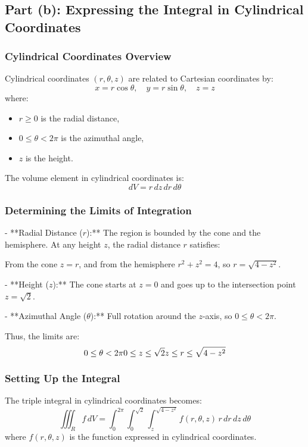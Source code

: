 \documentclass[11pt]{article}
\begin{document}
\newpage

\subsection{Part (b): Expressing the Integral in Cylindrical Coordinates}

\subsubsection{Cylindrical Coordinates Overview}
Cylindrical coordinates \((r, \theta, z)\) are related to Cartesian coordinates by:
\[
x = r \cos\theta, \quad y = r \sin\theta, \quad z = z
\]
where:
\begin{itemize}
    \item \( r \geq 0 \) is the radial distance,
    \item \( 0 \leq \theta < 2\pi \) is the azimuthal angle,
    \item \( z \) is the height.
\end{itemize}
The volume element in cylindrical coordinates is:
\[
dV = r \, dz \, dr \, d\theta
\]

\subsubsection{Determining the Limits of Integration}

- **Radial Distance (\( r \)):** The region is bounded by the cone and the hemisphere. At any height \( z \), the radial distance \( r \) satisfies:

  From the cone \( z = r \), and from the hemisphere \( r^2 + z^2 = 4 \), so \( r = \sqrt{4 - z^2} \).

- **Height (\( z \)):** The cone starts at \( z = 0 \) and goes up to the intersection point \( z = \sqrt{2} \).

- **Azimuthal Angle (\( \theta \)):** Full rotation around the \( z \)-axis, so \( 0 \leq \theta < 2\pi \).

Thus, the limits are:
\[
0 \leq \theta < 2\pi \\
0 \leq z \leq \sqrt{2} \\
z \leq r \leq \sqrt{4 - z^2}
\]

\subsubsection{Setting Up the Integral}

The triple integral in cylindrical coordinates becomes:
\[
\iiint_{R} f \, dV = \int_{0}^{2\pi} \int_{0}^{\sqrt{2}} \int_{z}^{\sqrt{4 - z^2}} f(r, \theta, z) \, r \, dr \, dz \, d\theta
\]
where \( f(r, \theta, z) \) is the function expressed in cylindrical coordinates.
\end{document}
